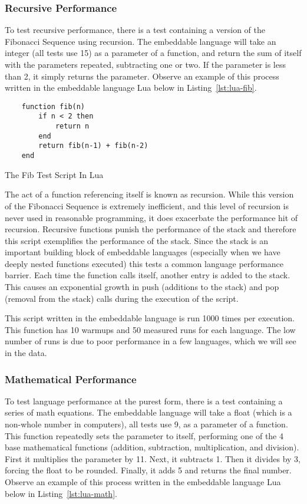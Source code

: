 \subsubsection{Recursive Performance}
To test recursive performance, there is a test containing a version of the Fibonacci Sequence using recursion. The embeddable language will take an integer (all tests use 15) as a parameter of a function, and return the sum of itself with the parameters repeated, subtracting one or two. If the parameter is less than 2, it simply returns the parameter. Observe an example of this process written in the embeddable language Lua below in Listing~\ref{lst:lua-fib}.

\begin{listing}[H]
    \begin{verbatim}
    function fib(n)
        if n < 2 then
            return n
        end
        return fib(n-1) + fib(n-2)
    end
    \end{verbatim}
    \caption{The Fib Test Script In Lua}
    \label{lst:lua-fib}
\end{listing}

The act of a function referencing itself is known as recursion. While this version of the Fibonacci Sequence is extremely inefficient, and this level of recursion is never used in reasonable programming, it does exacerbate the performance hit of recursion. Recursive functions punish the performance of the stack\cite{recursion:performance} and therefore this script exemplifies the performance of the stack. Since the stack is an important building block of embeddable languages (especially when we have deeply nested functions executed) this tests a common language performance barrier. Each time the function calls itself, another entry is added to the stack. This causes an exponential growth in push (additions to the stack) and pop (removal from the stack) calls during the execution of the script.

This script written in the embeddable language is run 1000 times per execution. This function has 10 warmups and 50 measured runs for each language. The low number of runs is due to poor performance in a few languages, which we will see in the data.

\subsubsection{Mathematical Performance}
To test language performance at the purest form, there is a test containing a series of math equations. The embeddable language will take a float (which is a non-whole number in computers), all tests use 9, as a parameter of a function. This function repeatedly sets the parameter to itself, performing one of the 4 base mathematical functions (addition, subtraction, multiplication, and division). First it multiplies the parameter by 11. Next, it subtracts 1. Then it divides by 3, forcing the float to be rounded. Finally, it adds 5 and returns the final number. Observe an example of this process written in the embeddable language Lua below in Listing~\ref{lst:lua-math}.


